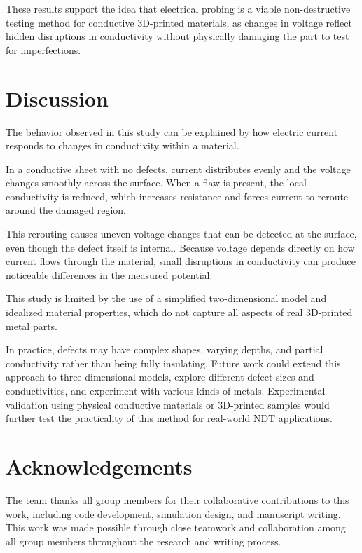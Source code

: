 \documentclass[reprint,amsmath,amssymb,aps]{revtex4-2}
\begin{document}
These results support the idea that electrical probing is a viable non-destructive testing method for conductive 3D-printed materials, as changes in voltage reflect hidden disruptions in conductivity without physically damaging the part to test for imperfections. 


\section{Discussion}

The behavior observed in this study can be explained by how electric current responds to changes in conductivity within a material.

In a conductive sheet with no defects, current distributes evenly and the voltage changes smoothly across the surface. When a flaw is present, the local conductivity is reduced, which increases resistance and forces current to reroute around the damaged region. 

This rerouting causes uneven voltage changes that can be detected at the surface, even though the defect itself is internal. Because voltage depends directly on how current flows through the material, small disruptions in conductivity can produce noticeable differences in the measured potential. 

This study is limited by the use of a simplified two-dimensional model and idealized material properties, which do not capture all aspects of real 3D-printed metal parts. 

In practice, defects may have complex shapes, varying depths, and partial conductivity rather than being fully insulating. Future work could extend this approach to three-dimensional models, explore different defect sizes and conductivities, and experiment with various kinds of metals. Experimental validation using physical conductive materials or 3D-printed samples would further test the practicality of this method for real-world NDT applications. 



\section{Acknowledgements} 

The team thanks all group members for their collaborative contributions to this work, including code development, simulation design, and manuscript writing. This work was made possible through close teamwork and collaboration among all group members throughout the research and writing process. 
\end{document}
